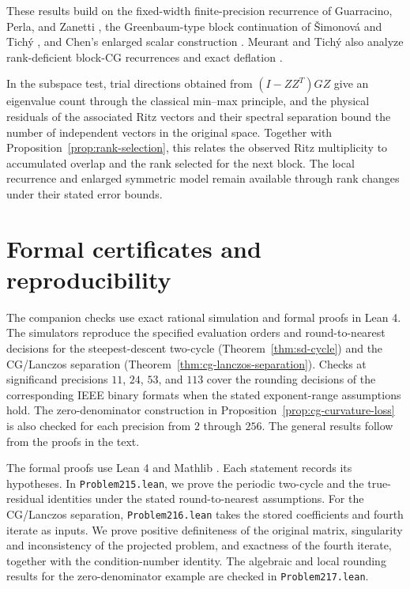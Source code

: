 \documentclass[11pt]{article}
\theoremstyle{definition}
\begin{document}
These results build on the fixed-width finite-precision recurrence of
Guarracino, Perla, and Zanetti \cite{GuarracinoPerlaZanetti2006}, the
Greenbaum-type block continuation of \v{S}imonov\'a and Tich\'y
\cite{SimonovaTichy2025}, and Chen's enlarged scalar construction
\cite{Chen2026Simple}.  Meurant and Tich\'y also analyze rank-deficient
block-CG recurrences and exact deflation
\cite{MeurantTichy2026Dubrulle}.

In the subspace test, trial directions obtained
from $(I-ZZ^T)GZ$ give an eigenvalue count through the classical min--max
principle, and the physical residuals of the associated Ritz vectors and
their spectral separation bound the number of independent vectors in the
original space.  Together with
Proposition~\ref{prop:rank-selection}, this relates the observed Ritz
multiplicity to accumulated overlap and the rank selected for the next
block.  The local recurrence and enlarged symmetric model remain available
through rank changes under their stated error bounds.
\section{Formal certificates and reproducibility}
\label{sec:certificates}

The companion checks use exact rational simulation and formal proofs in
Lean 4. The simulators reproduce the specified evaluation orders and
round-to-nearest decisions for the steepest-descent two-cycle
(Theorem~\ref{thm:sd-cycle}) and the CG/Lanczos separation
(Theorem~\ref{thm:cg-lanczos-separation}). Checks at significand precisions
$11$, $24$, $53$, and $113$ cover the rounding decisions of the corresponding
IEEE binary formats when the stated exponent-range assumptions hold.
The zero-denominator construction in
Proposition~\ref{prop:cg-curvature-loss} is also checked for each precision
from $2$ through $256$. The general results follow from the proofs in the
text.

The formal proofs use Lean 4 and Mathlib \cite{Lean4,Mathlib2020}.
Each statement records its hypotheses. In \texttt{Problem215.lean}, we
prove the periodic two-cycle and the true-residual identities under the
stated round-to-nearest assumptions. For the CG/Lanczos separation,
\texttt{Problem216.lean} takes the stored coefficients and fourth iterate
as inputs. We prove positive definiteness of the original matrix, singularity
and inconsistency of the projected problem, and exactness of the fourth
iterate, together with the condition-number identity.
The algebraic and local rounding results for the zero-denominator example
are checked in \texttt{Problem217.lean}.
\end{document}
